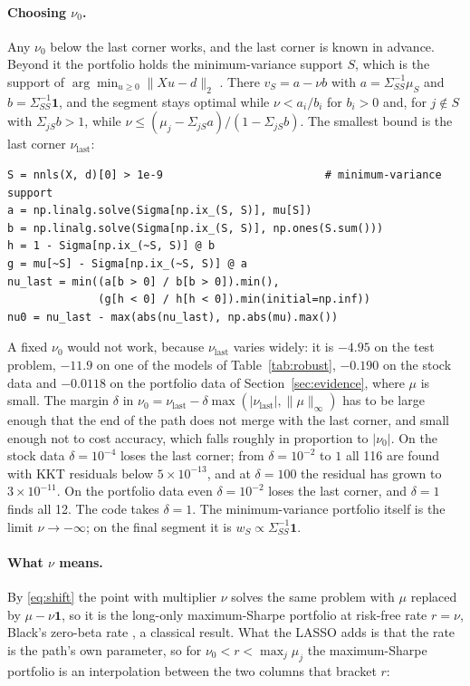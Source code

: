 \documentclass[11pt]{article}
\newcommand{\Sig}{\Sigma}
\begin{document}
\paragraph{Choosing $\nu_0$.} Any $\nu_0$ below the last corner works, and the last
corner is known in advance. Beyond it the portfolio holds the minimum-variance support
$S$, which is the support of $\arg\min_{u\ge0}\|Xu-d\|_2$ \cite{lawson1974}. There
$v_S=a-\nu b$ with $a=\Sig_{SS}^{-1}\mu_S$ and $b=\Sig_{SS}^{-1}\mathbf 1$, and the
segment stays optimal while $\nu<a_i/b_i$ for $b_i>0$ and, for $j\notin S$ with
$\Sig_{jS}b>1$, while $\nu\le(\mu_j-\Sig_{jS}a)/(1-\Sig_{jS}b)$. The smallest bound is the
last corner $\nu_{\mathrm{last}}$:

\begin{lstlisting}
S = nnls(X, d)[0] > 1e-9                         # minimum-variance support
a = np.linalg.solve(Sigma[np.ix_(S, S)], mu[S])
b = np.linalg.solve(Sigma[np.ix_(S, S)], np.ones(S.sum()))
h = 1 - Sigma[np.ix_(~S, S)] @ b
g = mu[~S] - Sigma[np.ix_(~S, S)] @ a
nu_last = min((a[b > 0] / b[b > 0]).min(),
              (g[h < 0] / h[h < 0]).min(initial=np.inf))
nu0 = nu_last - max(abs(nu_last), np.abs(mu).max())
\end{lstlisting}

\noindent
A fixed $\nu_0$ would not work, because $\nu_{\mathrm{last}}$ varies widely: it is $-4.95$ on the test problem,
$-11.9$ on one of the models of Table~\ref{tab:robust}, $-0.190$ on the stock data and
$-0.0118$ on the portfolio data of Section~\ref{sec:evidence}, where $\mu$ is small. The margin $\delta$ in $\nu_0=\nu_{\mathrm{last}}-\delta
\max(|\nu_{\mathrm{last}}|,\|\mu\|_\infty)$ has to be large enough that the end of the
path does not merge with the last corner, and small enough not to cost accuracy, which
falls roughly in proportion to $|\nu_0|$. On the stock data $\delta=10^{-4}$ loses the
last corner; from $\delta=10^{-2}$ to $1$ all 116 are found with KKT residuals below
$5\times10^{-13}$, and at $\delta=100$ the residual has grown to $3\times10^{-11}$. On the
portfolio data even $\delta=10^{-2}$ loses the last corner, and $\delta=1$ finds all 12. The
code takes $\delta=1$. The minimum-variance portfolio itself is the limit $\nu\to-\infty$; on the
final segment it is $w_S\propto\Sig_{SS}^{-1}\mathbf 1$.

\paragraph{What $\nu$ means.} By \eqref{eq:shift} the point with multiplier $\nu$ solves
the same problem with $\mu$ replaced by $\mu-\nu\mathbf 1$, so it is the long-only
maximum-Sharpe portfolio at risk-free rate $r=\nu$, Black's zero-beta rate
\cite{black1972}, a classical result. What the LASSO adds is that the rate is the path's own
parameter, so for $\nu_0<r<\max_j\mu_j$ the maximum-Sharpe portfolio is an interpolation
between the two columns that bracket $r$:
\end{document}
